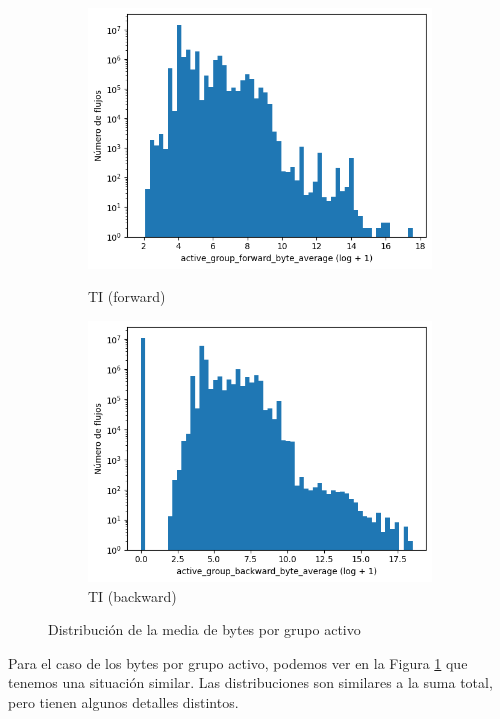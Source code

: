 \begin{figure}[H]
\begin{subfigure}[b]{0.26\textwidth}
        \includegraphics[width=\linewidth]{media/packet_pincer_toniot/active_group_forward_byte_average_log_x_log_y.png}
        \caption{TI (forward)}
        \includegraphics[width=\linewidth]{media/packet_pincer_toniot/active_group_backward_byte_average_log_x_log_y.png}
        \caption{TI (backward)}
    \end{subfigure}
       \caption{Distribución de la media de bytes por grupo activo}
       \label{fig:packet_pincer_active_group_byte_average}
\end{figure}

Para el caso de los bytes por grupo activo, podemos ver en la Figura \ref{fig:packet_pincer_active_group_byte_average} que tenemos una situación similar. Las distribuciones son similares a la suma total, pero tienen algunos detalles distintos.

